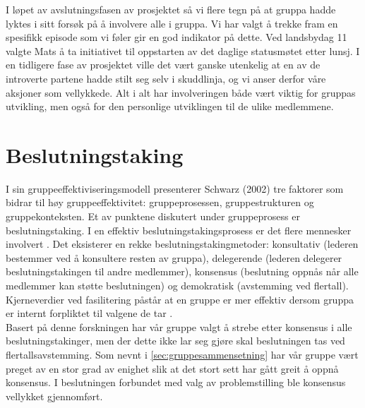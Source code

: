 I løpet av avslutningsfasen av prosjektet så vi flere tegn på at gruppa hadde lyktes i sitt forsøk på å involvere alle i gruppa. Vi har valgt å trekke fram en spesifikk episode som vi føler gir en god indikator på dette. Ved landsbydag 11 valgte Mats å ta initiativet til oppstarten av det daglige statusmøtet etter lunsj. I en tidligere fase av prosjektet ville det vært ganske utenkelig at en av de introverte partene hadde stilt seg selv i skuddlinja, og vi anser derfor våre aksjoner som vellykkede. Alt i alt har involveringen både vært viktig for gruppas utvikling, men også for den personlige utviklingen til de ulike medlemmene.\\


\section{Beslutningstaking}
\label{sec:beslutningstaking}
I sin gruppeeffektiviseringsmodell presenterer Schwarz (2002)\citep{fasilitator} tre faktorer som bidrar til høy gruppeeffektivitet: gruppeprosessen, gruppestrukturen og gruppekonteksten. Et av punktene diskutert under gruppeprosess er beslutningstaking. I en effektiv beslutningstakingsprosess er det flere mennesker involvert . Det eksisterer en rekke beslutningstakingmetoder: konsultativ (lederen bestemmer  ved å konsultere resten av gruppa), delegerende (lederen delegerer beslutningstakingen til andre medlemmer), konsensus (beslutning oppnås når alle medlemmer kan støtte beslutningen) og demokratisk (avstemming ved flertall). Kjerneverdier ved fasilitering påstår at en gruppe er mer effektiv dersom gruppa er internt forpliktet til valgene de tar \citep{fasilitator}.\\

Basert på denne forskningen har vår gruppe valgt å strebe etter konsensus i alle beslutningstakinger, men der dette ikke lar seg gjøre skal beslutningen tas ved flertallsavstemming. Som nevnt i \ref{sec:gruppesammensetning} har vår gruppe vært preget av en stor grad av enighet slik at det stort sett har gått greit å oppnå konsensus. I beslutningen forbundet med valg av problemstilling ble konsensus vellykket gjennomført.\\

